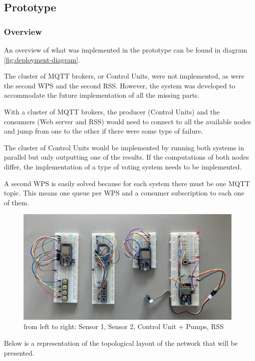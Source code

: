 \documentclass[11pt]{article}
\begin{document}
\subsection{Prototype}

\subsubsection{Overview}

An overview of what was implemented in the prototype can be found in diagram \ref{fig:deployment-diagram}.

The cluster of MQTT brokers, or Control Units, were not implemented, as were the second WPS and the second RSS.
However, the system was developed to accommodate the future implementation of all the missing parts.

With a cluster of MQTT brokers, the producer (Control Units) and the consumers (Web server and RSS) would need to connect to all the available nodes and jump from one to the other if there were some type of failure.

The cluster of Control Units would be implemented by running both systems in parallel but only outputting one of the results. If the computations of both nodes differ, the implementation of a type of voting system needs to be implemented.

A second WPS is easily solved because for each system there must be one MQTT topic. This means one queue per WPS and a consumer subscription to each one of them.

\begin{figure}[H]
  \centering
  \includegraphics[width=\linewidth]{../diagrams/hardware.jpg}
  \caption{from left to right: Sensor 1, Sensor 2, Control Unit + Pumps, RSS}
  \label{fig:hardware}
\end{figure}

Below is a representation of the topological layout of the network that will be presented.
\end{document}
